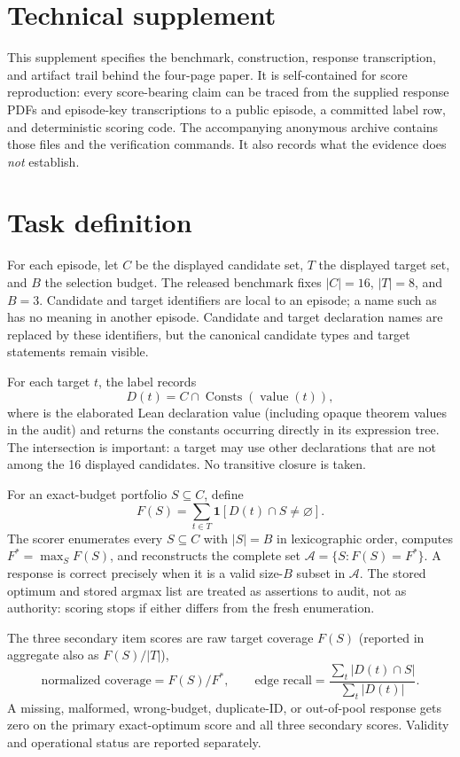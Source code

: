 \ifdefined\StandaloneTechnicalSupplement\else
\section*{Technical supplement}
\fi

This supplement specifies the benchmark, construction, response transcription,
and artifact trail behind the four-page paper.  It is self-contained for score
reproduction: every score-bearing claim can be traced from the supplied response
PDFs and episode-key transcriptions to a public episode, a committed label row,
and deterministic scoring code.  The accompanying anonymous archive contains
those files and the verification commands.  It also records what the evidence
does \emph{not} establish.

\section{Task definition}

For each episode, let $C$ be the displayed candidate set, $T$ the displayed
target set, and $B$ the selection budget.  The released benchmark fixes
$|C|=16$, $|T|=8$, and $B=3$.  Candidate and target identifiers are local to an
episode; a name such as  has no meaning in another episode.  Candidate
and target declaration names are replaced by these identifiers, but the
canonical candidate types and target statements remain visible.

For each target $t$, the label records
\[
 D(t)= C\cap \operatorname{Consts}(\operatorname{value}(t)),
\]
where  is the elaborated Lean declaration value (including opaque
theorem values in the audit) and  returns the constants occurring
directly in its expression tree.  The intersection is important: a target may
use other declarations that are not among the 16 displayed candidates.  No
transitive closure is taken.

For an exact-budget portfolio $S\subseteq C$, define
\[
 F(S)=\sum_{t\in T}\mathbf{1}[D(t)\cap S\ne\varnothing].
\]
The scorer enumerates every $S\subseteq C$ with $|S|=B$ in lexicographic order,
computes $F^*=\max_S F(S)$, and reconstructs the complete set
$\mathcal{A}=\{S:F(S)=F^*\}$.  A response is correct precisely when it is a
valid size-$B$ subset in $\mathcal{A}$.  The stored optimum and stored argmax
list are treated as assertions to audit, not as authority: scoring stops if
either differs from the fresh enumeration.

The three secondary item scores are raw target coverage $F(S)$ (reported in
aggregate also as $F(S)/|T|$),
\[
 \text{normalized coverage}=F(S)/F^*,\qquad
 \text{edge recall}=\frac{\sum_t |D(t)\cap S|}{\sum_t |D(t)|}.
\]
A missing, malformed, wrong-budget, duplicate-ID, or out-of-pool response gets
zero on the primary exact-optimum score and all three secondary scores.
Validity and operational status are reported separately.

